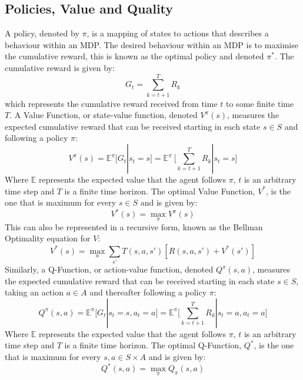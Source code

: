 \subsection{Policies, Value and Quality}
A policy, denoted by $\pi$, is a mapping of states to actions that describes a behaviour within an MDP. The desired behaviour within an MDP is to maximise the cumulative reward, this is known as the optimal policy and denoted $\pi^*$. The cumulative reward is given by:
\begin{equation}
\label{eqn:return}
G_t = \sum_{k=t+1}^TR_{k}
\end{equation}
which represents the cumulative reward received from time $t$ to some finite time $T$.
A Value Function, or state-value function, denoted $V^\pi(s)$, measures the expected cumulative reward that can be received starting in each state $s \in S$ and following a policy $\pi$:
\begin{equation}
\label{eqn:vs}
    V^\pi(s) = \mathbb{E}^\pi\Bigg[G_t | s_t = s\Bigg] = \mathbb{E}^\pi\ \Bigg[\sum_{k=t+1}^TR_{k} | s_t = s \Bigg]
\end{equation}
Where $\mathbb{E}$ represents the expected value that the agent follows $\pi$, $t$ is an arbitrary time step and $T$ is a finite time horizon.
The optimal Value Function, $V^*$, is the one that is maximum for every $s \in S$ and is given by:
\begin{equation}
\label{eqn:vsm}
     V^*(s) = \max_\pi V^\pi(s) 
\end{equation}
This can also be represented in a recursive form, known as the Bellman Optimality equation for $V$:
\begin{equation}
\label{eqn:vsB}
V^*(s) = \max_a\sum_{s'}T(s,a,s')[R(s,a,s')+V^*(s')]
\end{equation}
Similarly, a Q-Function, or action-value function, denoted $Q^\pi(s,a)$, measures the expected cumulative reward that can be received starting in each state $s \in S$, taking an action $a \in A$ and thereafter following a policy $\pi$:
\begin{equation}
\label{eqn:qsa}
Q^\pi(s,a) = \mathbb{E}^\pi\Bigg[G_t | s_t = s,a_t = a\Bigg] = \mathbb{E}^\pi\Bigg[\sum_{k=t+1}^TR_{k}|s_t=a, a_t = a\Bigg]
\end{equation}
Where $\mathbb{E}$ represents the expected value that the agent follows $\pi$, $t$ is an arbitrary time step and $T$ is a finite time horizon.
The optimal Q-Function, $Q^*$, is the one that is maximum for every $s,a \in S \times A$ and is given by:
\begin{equation}
\label{eqn:qso}
Q^*(s,a) = \max_\pi Q_\pi(s,a)
\end{equation}
